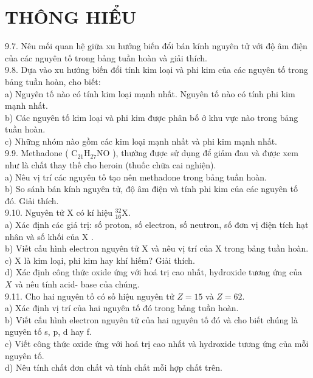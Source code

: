 \documentclass[10pt]{article}
\begin{document}
\section*{THÔNG HIỂU}
9.7. Nêu mối quan hệ giữa xu hướng biến đổi bán kính nguyên tử với độ âm điện của các nguyên tố trong bảng tuần hoàn và giải thích.\\
9.8. Dựa vào xu hướng biến đổi tính kim loại và phi kim của các nguyên tố trong bảng tuần hoàn, cho biết:\\
a) Nguyên tố nào có tính kim loại mạnh nhất. Nguyên tố nào có tính phi kim mạnh nhất.\\
b) Các nguyên tố kim loại và phi kim được phân bố ở khu vực nào trong bảng tuần hoàn.\\
c) Những nhóm nào gồm các kim loại mạnh nhất và phi kim mạnh nhất.\\
9.9. Methadone ( $\mathrm{C}_{21} \mathrm{H}_{27} \mathrm{NO}$ ), thường được sử dụng để giảm đau và được xem như là chất thay thế cho heroin (thuốc chữa cai nghiện).\\
a) Nêu vị trí các nguyên tố tạo nên methadone trong bảng tuần hoàn.\\
b) So sánh bán kính nguyên tử, độ âm điện và tính phi kim của các nguyên tố đó. Giải thích.\\
9.10. Nguyên tử X có kí hiệu ${ }_{16}^{32} \mathrm{X}$.\\
a) Xác định các giá trị: số proton, số electron, số neutron, số đơn vị điện tích hạt nhân và số khối của X .\\
b) Viết cấu hình electron nguyên tử X và nêu vị trí của X trong bảng tuần hoàn.\\
c) X là kim loại, phi kim hay khí hiếm? Giải thích.\\
d) Xác định công thức oxide ứng với hoá trị cao nhất, hydroxide tương ứng của $X$ và nêu tính acid- base của chúng.\\
9.11. Cho hai nguyên tố có số hiệu nguyên tử $Z=15$ và $Z=62$.\\
a) Xác định vị trí của hai nguyên tố đó trong bảng tuần hoàn.\\
b) Viết cấu hình electron nguyên tử của hai nguyên tố đó và cho biết chúng là nguyên tố s, p, d hay f.\\
c) Viết công thức oxide ứng với hoá trị cao nhất và hydroxide tương ứng của mỗi nguyên tố.\\
d) Nêu tính chất đơn chất và tính chất mỗi hợp chất trên.
\end{document}
